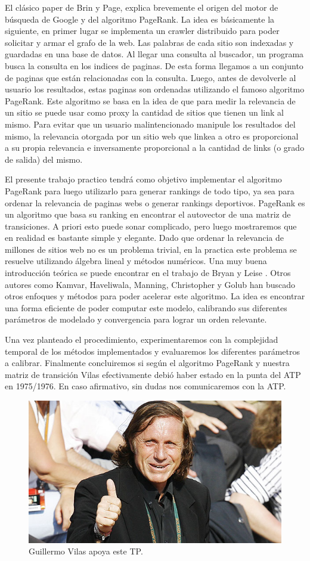 El clásico paper de Brin y Page,  \cite{Brin1998} explica brevemente el origen del motor de búsqueda de Google y del algoritmo PageRank. La idea es básicamente la siguiente, en primer lugar se implementa un crawler distribuido para poder solicitar y armar el grafo de la web. Las palabras de cada sitio son indexadas y guardadas en una base de datos. Al llegar una consulta al buscador, un programa busca la consulta en los indices de paginas. De esta forma llegamos a un conjunto de paginas que están relacionadas con la consulta. Luego, antes de devolverle al usuario los resultados, estas paginas son ordenadas utilizando el famoso algoritmo PageRank. Este algoritmo se basa en la idea de que para medir la relevancia de un sitio se puede usar como proxy la cantidad de sitios que tienen un link al mismo. Para evitar que un usuario malintencionado manipule los resultados del mismo, la relevancia otorgada por un sitio web que linkea a otro es proporcional a su propia relevancia e inversamente proporcional a la cantidad de links (o grado de salida) del mismo.

El presente trabajo practico tendrá como objetivo implementar el algoritmo PageRank para luego utilizarlo para generar rankings de todo tipo, ya sea para ordenar la relevancia de paginas webs o generar rankings deportivos. PageRank es un algoritmo que basa su ranking en encontrar el autovector de una matriz de transiciones. A priori esto puede sonar complicado, pero luego mostraremos que en realidad es bastante simple y elegante. Dado que ordenar la relevancia de millones de sitios web no es un problema trivial, en la practica este problema se resuelve utilizando álgebra lineal y métodos numéricos. Una muy buena introducción teórica se puede encontrar en el trabajo de Bryan y Leise \cite{Bryan2006}. Otros autores como Kamvar, Haveliwala, Manning, Christopher y Golub \cite{Kamvar2003} han buscado otros enfoques y métodos para poder acelerar este algoritmo. La idea es encontrar una forma eficiente de poder computar este modelo, calibrando sus diferentes parámetros de modelado y convergencia para lograr un orden relevante. 

Una vez planteado el procedimiento, experimentaremos con la complejidad temporal de los métodos implementados y evaluaremos los diferentes parámetros a calibrar. Finalmente concluiremos si según el algoritmo PageRank y nuestra matriz de transición Vilas efectivamente debió haber estado en la punta del ATP en 1975/1976. En caso afirmativo, sin dudas nos comunicaremos con la ATP.

\begin{figure}[H]
  \centering
  \includegraphics[scale=0.5]{images/vilasaprueba}
  \caption{Guillermo Vilas apoya este TP.}
\end{figure}